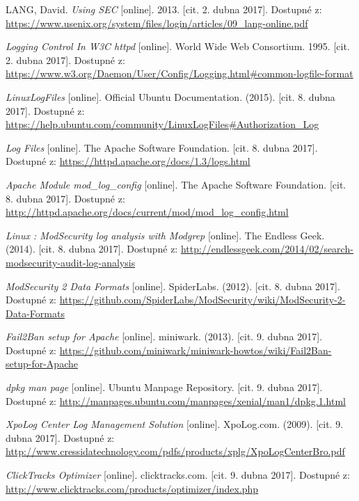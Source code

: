 \documentclass[thesis=B,czech]{FITthesis}[2012/06/26]
\begin{document}
\begin{thebibliography}{9}
	LANG, David. \textit{Using SEC} [online]. 2013. [cit. 2. dubna 2017]. Dostupné z: \url{https://www.usenix.org/system/files/login/articles/09_lang-online.pdf}
	
	\textit{Logging Control In W3C httpd} [online]. World Wide Web Consortium. 1995.
	[cit. 2. dubna 2017]. Dostupné z: \url{https://www.w3.org/Daemon/User/Config/Logging.html#common-logfile-format}
		
	\textit{LinuxLogFiles} [online]. Official Ubuntu Documentation. (2015). [cit. 8. dubna 2017]. Dostupné z: \url{https://help.ubuntu.com/community/LinuxLogFiles#Authorization_Log}
	
	\textit{Log Files} [online]. The Apache Software Foundation. [cit. 8. dubna 2017]. Dostupné z: \url{https://httpd.apache.org/docs/1.3/logs.html}
	
	\textit{Apache Module mod\_log\_config} [online]. The Apache Software Foundation. [cit. 8. dubna 2017]. Dostupné z: \url{http://httpd.apache.org/docs/current/mod/mod_log_config.html}
	
	\textit{Linux : ModSecurity log analysis with Modgrep} [online]. The Endless Geek. (2014). [cit. 8. dubna 2017]. Dostupné z: \url{http://endlessgeek.com/2014/02/search-modsecurity-audit-log-analysis}
	
	\textit{ModSecurity 2 Data Formats} [online]. SpiderLabs. (2012). [cit. 8. dubna 2017]. Dostupné z: \url{https://github.com/SpiderLabs/ModSecurity/wiki/ModSecurity-2-Data-Formats}
	
	\textit{Fail2Ban setup for Apache} [online]. miniwark. (2013). [cit. 9. dubna 2017]. Dostupné z: \url{https://github.com/miniwark/miniwark-howtos/wiki/Fail2Ban-setup-for-Apache}
	
	\textit{dpkg man page} [online]. Ubuntu Manpage Repository. [cit. 9. dubna 2017]. Dostupné z: \url{http://manpages.ubuntu.com/manpages/xenial/man1/dpkg.1.html}
	
	\textit{XpoLog Center Log Management Solution} [online]. XpoLog.com. (2009). [cit. 9. dubna 2017]. Dostupné z: \url{http://www.cressidatechnology.com/pdfs/products/xplg/XpoLogCenterBro.pdf}
	
	\textit{ClickTracks Optimizer} [online]. clicktracks.com. [cit. 9. dubna 2017]. Dostupné z: \url{http://www.clicktracks.com/products/optimizer/index.php}
	

\end{thebibliography}
\end{document}
